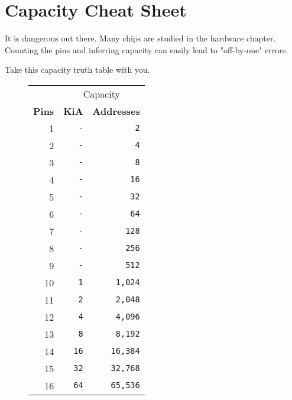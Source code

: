 \chapter*{Capacity Cheat Sheet}
It is dangerous out there. Many chips are studied in the hardware chapter. Counting the pins and inferring capacity can easily lead to "off-by-one" errors. 

Take this capacity truth table with you.


\begin{figure}[H]
\begin{minipage}[t]{0.49\linewidth}
{ 
\setlength{\tabcolsep}{3.0pt}
\setlength\cmidrulewidth{\heavyrulewidth} %
\begin{tabular}{rrr}

  & \multicolumn{2}{c}{Capacity} \\
  \cmidrule(lr){2-3}
  
 
  \textbf{Pins} & \textbf{KiA} & \textbf{Addresses}\\               
            
  \toprule    
1            &    \texttt{-} &      \texttt{2}   \\
2   &\texttt{-}            &      \texttt{4}   \\
3  &    \texttt{-} &      \texttt{8}   \\
4  &\texttt{-}            &      \texttt{16}   \\
5  &    \texttt{-} &      \texttt{32}   \\
6   &    \texttt{-} &      \texttt{64}   \\
7   &    \texttt{-} &      \texttt{128}   \\
8            &    \texttt{-} &      \texttt{256}   \\
9           &    \texttt{-} &      \texttt{512}   \\
10   &    \texttt{1}           &      \texttt{1,024} \\
11   &    \texttt{2}           &\texttt{2,048}    \\
12   &    \texttt{4}           &      \texttt{4,096} \\
13   &    \texttt{8}          &      \texttt{8,192} \\
14            &    \texttt{16}           &      \texttt{16,384} \\
15  &    \texttt{32}           &\texttt{32,768}    \\
  16  &    \texttt{64}           &\texttt{65,536}    \\


\end{tabular}}
\end{minipage}
\end{figure}
